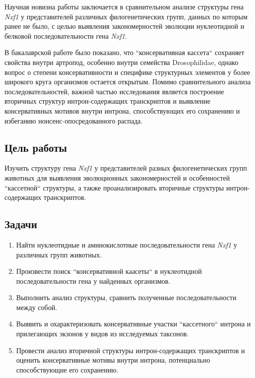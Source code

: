 Научная новизна работы заключается в сравнительном анализе структуры гена \textit{Nxf1} у представителей различных филогенетических групп, данных по которым ранее не было, с целью выявления закономерностей эволюции нуклеотидной и белковой последовательности гена \textit{Nxf1}.

В бакалаврской работе было показано, что ``консервативная кассета`` сохраняет свойства внутри артропод, особенно внутри семейства Drosophilidae, однако вопрос о степени консервативности и специфике структурных элементов у более широкого круга организмов остается открытым.
Помимо сравнительного анализа последовательностей, важной частью исследования является построение вторичных структур интрон-содержащих транскриптов и выявление консервативных мотивов внутри интрона, способствующих его сохранению и избеганию нонсенс-опосредованного распада.


\subsection{Цель работы}

Изучить структуру гена \textit{Nxf1} у представителей разных филогенетических групп животных для выявления эволюционных закономерностей и особенностей ``кассетной`` структуры, а также проанализировать вторичные структуры интрон-содержа\-щих транскриптов.


\subsection{Задачи}

\begin{enumerate}[left=\parindent]
  \item Найти нуклеотидные и аминокислотные последовательности гена \textit{Nxf1} у различных групп животных.
  \item Произвести поиск ``консервативной каасеты`` в нуклеотидной последовательности гена у найденных организмов.
  \item Выполнить анализ структуры, сравнить полученные последовательности между собой.
  \item Выявить и охарактеризовать консервативные участки ``кассетного`` интрона и прилегающих экзонов у видов из исследуемых таксонов.
  \item Провести анализ вторичной структуры интрон-содержащих транскриптов и оценить консервативные мотивы внутри интрона, потенциально способствующие его сохранению.
\end{enumerate}

